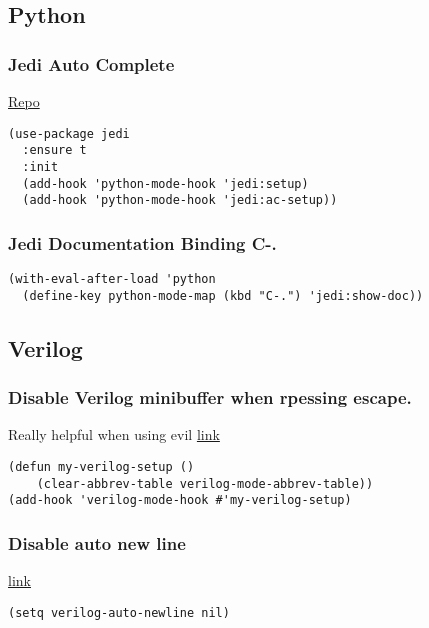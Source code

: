 \documentclass[11pt]{article}
\begin{document}
\subsection{Python}
\label{sec-3-2}
\subsubsection{Jedi Auto Complete}
\label{sec-3-2-1}
\href{https://github.com/tkf/emacs-jedi}{Repo}
\begin{verbatim}
(use-package jedi
  :ensure t
  :init
  (add-hook 'python-mode-hook 'jedi:setup)
  (add-hook 'python-mode-hook 'jedi:ac-setup))
\end{verbatim}
\subsubsection{Jedi Documentation Binding C-.}
\label{sec-3-2-2}
\begin{verbatim}
(with-eval-after-load 'python
  (define-key python-mode-map (kbd "C-.") 'jedi:show-doc))
\end{verbatim}
\subsection{Verilog}
\label{sec-3-3}
\subsubsection{Disable Verilog minibuffer when rpessing escape.}
\label{sec-3-3-1}
Really helpful when using evil
\href{https://emacs.stackexchange.com/questions/38468/disable-autocompletion-abbreviation-in-verilog-mode?utm_medium\%3Dorganic&utm_source\%3Dgoogle_rich_qa&utm_campaign\%3Dgoogle_rich_qa}{link}
\begin{verbatim}
(defun my-verilog-setup ()
    (clear-abbrev-table verilog-mode-abbrev-table))
(add-hook 'verilog-mode-hook #'my-verilog-setup)
\end{verbatim}
\subsubsection{Disable auto new line}
\label{sec-3-3-2}
\href{https://stackoverflow.com/questions/27098826/how-to-disable-auto-new-line-in-verilog-mode-in-emacs?utm_medium\%3Dorganic&utm_source\%3Dgoogle_rich_qa&utm_campaign\%3Dgoogle_rich_qa}{link}
\begin{verbatim}
(setq verilog-auto-newline nil)
\end{verbatim}
\end{document}

